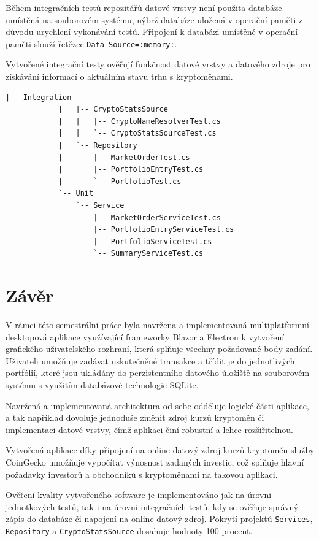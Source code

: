 \documentclass[12pt, a4paper]{article}
\begin{document}
    Během integračních testů repozitářů datové vrstvy není použita databáze umístěná na souborovém systému, nýbrž databáze uložená v operační paměti z důvodu urychlení vykonávání testů. Připojení k databázi umístěné v operační paměti slouží řetězec \texttt{Data Source=:memory:}.

    Vytvořené integrační testy ověřují funkčnost datové vrstvy a datového zdroje pro získávání informací o aktuálním stavu trhu s kryptoměnami.

    \begin{lstlisting}[caption={Struktura projektu \texttt{Tests} obsahující integrační a jednotkové testy}, captionpos=b]
            |-- Integration
            |   |-- CryptoStatsSource
            |   |   |-- CryptoNameResolverTest.cs
            |   |   `-- CryptoStatsSourceTest.cs
            |   `-- Repository
            |       |-- MarketOrderTest.cs
            |       |-- PortfolioEntryTest.cs
            |       `-- PortfolioTest.cs
            `-- Unit
                `-- Service
                    |-- MarketOrderServiceTest.cs
                    |-- PortfolioEntryServiceTest.cs
                    |-- PortfolioServiceTest.cs
                    `-- SummaryServiceTest.cs
    \end{lstlisting}
    
    \section{Závěr}
    V rámci této semestrální práce byla navržena a implementovaná multiplatformní desktopová aplikace využívající frameworky
    Blazor a Electron k vytvoření grafického uživatelského rozhraní, která splňuje všechny požadované body zadání.
    Uživateli umožňuje zadávat uskutečněné transakce a třídit je do jednotlivých portfólií, které jsou ukládány do perzistentního
    datového úložiště na souborovém systému s využitím databázové technologie SQLite.
    
    Navržená a implementovaná architektura od sebe odděluje logické části aplikace, a tak například dovoluje jednoduše změnit zdroj kurzů kryptoměn či implementaci datové vrstvy,
    čímž aplikaci činí robustní a lehce rozšiřitelnou.
    
    Vytvořená aplikace díky připojení na online datový zdroj kurzů kryptoměn služby CoinGecko umožňuje vypočítat výnosnost
    zadaných investic, což splňuje hlavní požadavky investorů a obchodníků s kryptoměnami na takovou aplikaci.
    
    Ověření kvality vytvořeného software je implementováno jak na úrovni jednotkových testů, tak i na úrovni integračních testů,
    kdy se ověřuje správný zápis do databáze či napojení na online datový zdroj. Pokrytí projektů \texttt{Services},
    \texttt{Repository} a \texttt{CryptoStatsSource} dosahuje hodnoty 100 procent.
    
\end{document}
